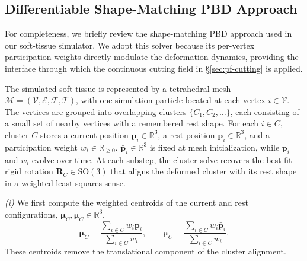 \documentclass[letterpaper, 10 pt, conference]{ieeeconf}  %
\theoremstyle{tight}
\begin{document}

\subsection{Differentiable Shape-Matching PBD Approach}
\label{sec:pbd-substrate}
For completeness, we briefly review the shape-matching PBD approach used in our
soft-tissue simulator. We adopt this solver because its per-vertex participation
weights directly modulate the deformation dynamics, providing the interface
through which the continuous cutting field in \S\ref{sec:pf-cutting} is applied.



The simulated soft tissue is represented by a tetrahedral mesh
$\mathcal{M}=(\mathcal{V},\mathcal{E},\mathcal{F},\mathcal{T})$, with one
simulation particle located at each vertex $i\in\mathcal{V}$. The vertices
are grouped into overlapping clusters $\{C_1,C_2,\ldots\}$, each consisting
of a small set of nearby vertices with a remembered rest shape. For each
$i\in C$, cluster $C$ stores a current position
$\mathbf{p}_i\in\mathbb{R}^3$, a rest position
$\bar{\mathbf{p}}_i\in\mathbb{R}^3$, and a participation weight
$w_i\in\mathbb{R}_{\geq0}$. $\bar{\mathbf{p}}_i\in\mathbb{R}^3$ is fixed at mesh
initialization, while $\mathbf{p}_i$ and $w_i$ evolve over time. At each
substep, the cluster solve recovers the best-fit rigid rotation
$\mathbf{R}_C\in\mathrm{SO}(3)$ that aligns the deformed cluster with its
rest shape in a weighted least-squares sense.

\emph{(i)} We first compute the weighted centroids of the current and rest
configurations,
$\boldsymbol{\mu}_C,\bar{\boldsymbol{\mu}}_C\in\mathbb{R}^3$,
\begin{equation}
  \boldsymbol{\mu}_C =
    \frac{\sum_{i \in C} w_i \mathbf{p}_i}{\sum_{i \in C} w_i},
  \qquad
  \bar{\boldsymbol{\mu}}_C =
    \frac{\sum_{i \in C} w_i \bar{\mathbf{p}}_i}{\sum_{i \in C} w_i}.
  \label{eq:centroid}
\end{equation}
These centroids remove the translational component of the cluster alignment.
\end{document}
